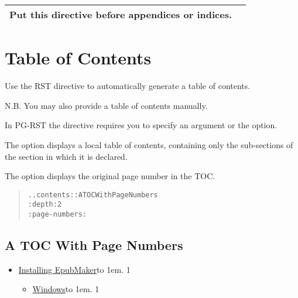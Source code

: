 \documentclass[a5paper]{book}
\begin{document}
\begin{german}
\begin{table}[htbp]
\begin{center}
\begin{longtable}{ll}
{{Put this directive before appendices or indices.\@arstrut}}\box0\tabularnewline
\bottomrule
\end{longtable}
\end{center}
\end{table}

%
\label{table-of-contents}%
\hypertarget{table-of-contents}{}%
%
\section*{Table of Contents}


Use the RST {} directive to automatically generate
a table of contents.\par

N.B. You may also provide a table of contents manually.\par

In PG-RST the {} directive requires you to specify
an argument or the {} option.\par

The {} option displays a local table of contents, containing
only the sub-sections of the section in which it is declared.\par

The {} option displays the original page number in
the TOC.\par

\begin{quote}
\begin{alltt}
.. contents:: A TOC With Page Numbers
   :depth: 2
   :page-numbers:
\end{alltt}
\end{quote}

\begin{contents_env}
%
\label{id6}%
\hypertarget{id6}{}%
%
\subsection*{A TOC With Page Numbers}


\begin{itemize}
\item[] \hyperlink{installing-epubmaker}{Installing EpubMaker}\leaders\hbox to 1em{\hss.\hss}\hfill{} 1
\begin{itemize}
\item[] \hyperlink{windows}{Windows}\leaders\hbox to 1em{\hss.\hss}\hfill{} 1


\end{itemize}
\end{itemize}
\end{contents_env}
\end{german}
\end{document}
